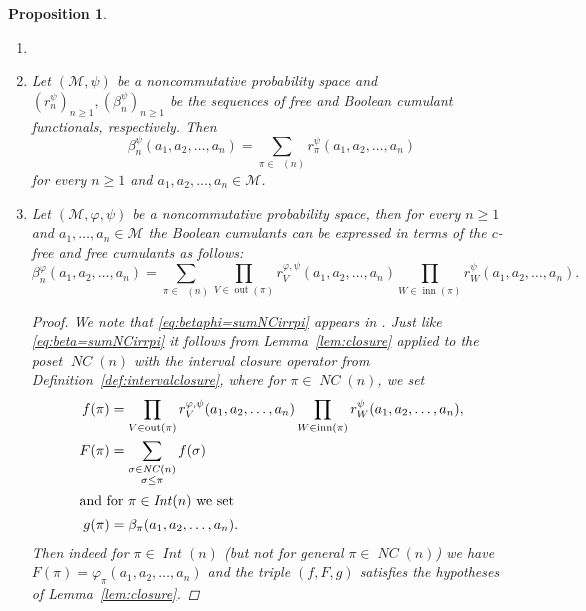 \documentclass[12pt]{amsart}
\DeclareMathOperator{\IntPart}{\mathit{Int}}
\DeclareMathOperator{\NC}{\mathit{NC}} %
\DeclareMathOperator{\NCirr}{{\mathit{NC}^\textit{irr}}} %
\DeclareMathOperator{\IB}{\mathrm{inn}} %
\DeclareMathOperator{\OB}{\mathrm{out}} %
\newcommand{\alg}[1]{\mathcal{#1}}
\newtheorem{proposition}[theorem]{Proposition}
\theoremstyle{definition}
\numberwithin{equation}{section}
\begin{document}
\begin{proposition}
  \begin{enumerate}[label=(\roman*)]
   \item []
    
   \item 
    Let $(\alg{M},\psi)$ be a noncommutative probability space and
    $(r^\psi_n)_{n\geq1},(\beta_n^\psi)_{n\geq1}$ be the sequences of free and
    Boolean cumulant functionals, respectively. Then
    \begin{equation}
      \label{eq:beta=sumNCirrpi}
      \beta_n^{\psi}(a_1,a_2,\dots,a_n) = \sum_{\pi\in\NCirr(n)}    r_\pi^{\psi}(a_1,a_2,\dots,a_n)
    \end{equation}
    for every $n\geq1$ and $a_1,a_2,\ldots,a_n\in \alg{M}$.
   \item 
    Let $(\alg{M},\varphi,\psi)$ be a noncommutative probability space,
    then for every $n\geq1$ and $a_1,\ldots,a_n\in \alg{M}$
    the Boolean cumulants can be expressed in terms of the $c$-free and free
    cumulants as follows:
    \begin{equation}
      \label{eq:betaphi=sumNCirrpi}
      \beta_n^{\varphi}(a_1,a_2,\dots,a_n) = \sum_{\pi\in\NCirr(n)}
      \prod_{V\in \OB(\pi)}
      r_V^{\varphi,\psi}(a_1,a_2,\dots,a_n)
      \prod_{W\in \IB(\pi)}
      r_W^{\psi}(a_1,a_2,\dots,a_n)
      .
    \end{equation}
    \begin{proof}
      We note that \eqref{eq:betaphi=sumNCirrpi}
      appears in \cite[Section~6]{EbrahimiFardPatras2020}.
      Just like \eqref{eq:beta=sumNCirrpi}
      it follows
      from Lemma~\ref{lem:closure}
      applied to the poset $\NC(n)$ with
      the interval closure operator
      from Definition~\ref{def:intervalclosure},
      where for $\pi\in\NC(n)$, we set
      \begin{align*}
        f(\pi)&=\prod_{V\in \OB(\pi)} 
        r_V^{\varphi,\psi}(a_1,a_2,\dots,a_n)
        \prod_{W\in \IB(\pi)}
                r_W^{\psi}(a_1,a_2,\dots,a_n) ,\\
        F(\pi)&= \sum_{\substack{\sigma\in\NC(n)\\ \sigma\leq\pi}} f(\sigma)\\
        \intertext{and for $\pi\in\IntPart(n)$ we set}
        g(\pi)&=\beta_{\pi}(a_1,a_2,\dots,a_n)
                .
      \end{align*}
      Then  indeed for $\pi\in\IntPart(n)$ (but not for general $\pi\in\NC(n)$)
      we have $F(\pi)=\varphi_\pi(a_1,a_2,\ldots,a_n)$ and the triple $(f,F,g)$
      satisfies
      the hypotheses
      of Lemma~\ref{lem:closure}. 

      
    \end{proof}
  \end{enumerate}
	
\end{proposition}
\end{document}

